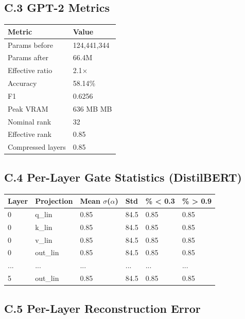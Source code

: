 \subsection{C.3 GPT-2 Metrics}

\begin{table}[H]
\centering
\small
\begin{tabular}{ll}
\toprule
\textbf{Metric} & \textbf{Value} \\
\midrule
Params before & 124,441,344 \\
Params after & 66.4M \\
Effective ratio & 2.1$\times$ \\
Accuracy & 58.14\% \\
F1 & 0.6256 \\
Peak VRAM & 636 MB MB \\
Nominal rank & 32 \\
Effective rank & 0.85 \\
Compressed layers & 0.85 \\
\bottomrule
\end{tabular}
\end{table}

\subsection{C.4 Per-Layer Gate Statistics (DistilBERT)}

\begin{table}[H]
\centering
\small
\begin{tabular}{llllll}
\toprule
\textbf{Layer} & \textbf{Projection} & \textbf{Mean $\sigma$($\alpha$)} & \textbf{Std} & \textbf{\% \textless{} 0.3} & \textbf{\% \textgreater{} 0.9} \\
\midrule
0 & q\_lin & 0.85 & 84.5 & 0.85 & 0.85 \\
0 & k\_lin & 0.85 & 84.5 & 0.85 & 0.85 \\
0 & v\_lin & 0.85 & 84.5 & 0.85 & 0.85 \\
0 & out\_lin & 0.85 & 84.5 & 0.85 & 0.85 \\
... & ... & ... & ... & ... & ... \\
5 & out\_lin & 0.85 & 84.5 & 0.85 & 0.85 \\
\bottomrule
\end{tabular}
\end{table}

\subsection{C.5 Per-Layer Reconstruction Error}

